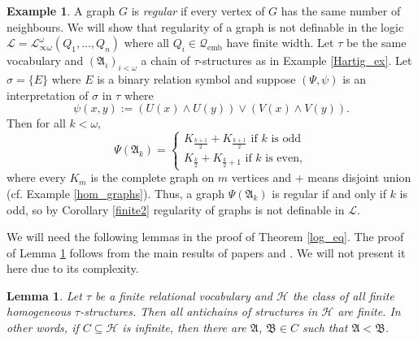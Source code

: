 \documentclass{ndjflart}
\theoremstyle{plain}
\newtheorem{lemma}[conjecture]{Lemma}
\theoremstyle{definition}
\newtheorem{example}[conjecture]{Example}
\numberwithin{equation}{section}
\DeclareMathOperator{\emb}{emb}
\begin{document}
\begin{example}\label{reg_graph_ex}
A graph $G$ is \emph{regular} if every vertex of $G$ has the same number of neighbours.
We will show that regularity of a graph is not definable in the logic
$\mathcal{L} = \mathcal{L}^{\omega}_{\infty \omega}(Q_1,\dots,Q_n)$ where all
$Q_i \in \mathcal{Q}_{\emb}$ have finite width.
Let $\tau$ be the same vocabulary and $(\mathfrak{A}_i)_{i<\omega}$ a chain of
$\tau$-structures as in Example \ref{Hartig_ex}.
Let $\sigma = \{E\}$ where $E$ is a binary relation symbol and suppose
$(\Psi,\psi)$ is an interpretation of $\sigma$ in $\tau$ where
\[
	\psi(x,y) := (U(x)\wedge U(y)) \vee (V(x) \wedge V(y)).
\]
Then for all $k<\omega$,
\[
	\Psi(\mathfrak{A}_k) = \begin{cases}
	K_{\frac{k+1}{2}} + K_{\frac{k+1}{2}} \text{ if } k \text{ is odd} \\
	K_{\frac{k}{2}} + K_{\frac{k}{2}+1} \text{ if } k \text{ is even},
	\end{cases}
\]
where every $K_m$ is the complete graph on $m$ vertices and $+$ means disjoint
union (cf. Example \ref{hom_graphs}).
Thus, a graph $\Psi(\mathfrak{A}_k)$ is regular if and only if $k$ is odd,
so by Corollary \ref{finite2} regularity of graphs is not definable in $\mathcal{L}$.
\end{example}

We will need the following lemmas in the proof of Theorem \ref{log_eq}.
The proof of Lemma \ref{shrinking} follows from the main results of papers
\cite{Cherlin:1986} and \cite{Lachlan:1984}. We will not present it here due to
its complexity.

\begin{lemma}\label{shrinking}
Let $\tau$ be a finite relational vocabulary and $\mathcal{H}$ the class of all
finite homogeneous $\tau$-structures.
Then all antichains of structures in $\mathcal{H}$ are finite.
In other words, if $C \subseteq \mathcal{H}$ is infinite, then there are
$\mathfrak{A}$, $\mathfrak{B} \in C$ such that $\mathfrak{A} < \mathfrak{B}$.
\end{lemma}
\end{document}
